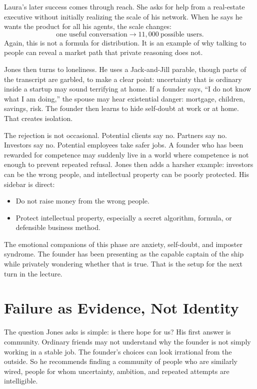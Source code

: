 Laura's later success comes through reach. She asks for help from a real-estate executive without initially realizing the scale of his network. When he says he wants the product for all his agents, the scale changes:
\begin{equation}
\text{one useful conversation}
\longrightarrow
11{,}000\ \text{possible users}.
\end{equation}
Again, this is not a formula for distribution. It is an example of why talking to people can reveal a market path that private reasoning does not.

Jones then turns to loneliness. He uses a Jack-and-Jill parable, though parts of the transcript are garbled, to make a clear point: uncertainty that is ordinary inside a startup may sound terrifying at home. If a founder says, ``I do not know what I am doing,'' the spouse may hear existential danger: mortgage, children, savings, risk. The founder then learns to hide self-doubt at work or at home. That creates isolation.

The rejection is not occasional. Potential clients say no. Partners say no. Investors say no. Potential employees take safer jobs. A founder who has been rewarded for competence may suddenly live in a world where competence is not enough to prevent repeated refusal. Jones then adds a harsher example: investors can be the wrong people, and intellectual property can be poorly protected. His sidebar is direct:
\begin{itemize}
\item Do not raise money from the wrong people.
\item Protect intellectual property, especially a secret algorithm, formula, or defensible business method.
\end{itemize}

The emotional companions of this phase are anxiety, self-doubt, and imposter syndrome. The founder has been presenting as the capable captain of the ship while privately wondering whether that is true. That is the setup for the next turn in the lecture.

\section{Failure as Evidence, Not Identity}

The question Jones asks is simple: is there hope for us? His first answer is community. Ordinary friends may not understand why the founder is not simply working in a stable job. The founder's choices can look irrational from the outside. So he recommends finding a community of people who are similarly wired, people for whom uncertainty, ambition, and repeated attempts are intelligible.

